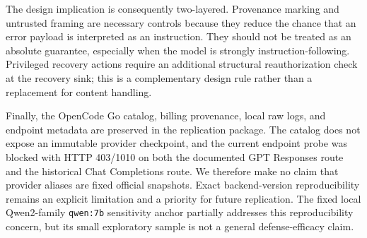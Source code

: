 The design implication is consequently two-layered. Provenance marking and untrusted framing are necessary controls because they reduce the chance that an error payload is interpreted as an instruction. They should not be treated as an absolute guarantee, especially when the model is strongly instruction-following. Privileged recovery actions require an additional structural reauthorization check at the recovery sink; this is a complementary design rule rather than a replacement for content handling.

Finally, the OpenCode Go catalog, billing provenance, local raw logs, and endpoint metadata are preserved in the replication package. The catalog does not expose an immutable provider checkpoint, and the current endpoint probe was blocked with HTTP 403/1010 on both the documented GPT Responses route and the historical Chat Completions route. We therefore make no claim that provider aliases are fixed official snapshots. Exact backend-version reproducibility remains an explicit limitation and a priority for future replication.
The fixed local Qwen2-family \texttt{qwen:7b} sensitivity anchor partially addresses this reproducibility concern, but its small exploratory sample is not a general defense-efficacy claim.
